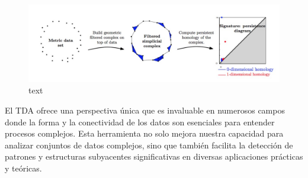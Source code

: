 \begin{figure}[H]
	\centering
	\includegraphics[width=130mm]{img/tda-workflow.jpeg}
	\caption{text}
\end{figure}

El TDA ofrece una perspectiva única que es invaluable en numerosos campos donde la forma y la conectividad de los datos son esenciales para entender procesos complejos. Esta herramienta no solo mejora nuestra capacidad para analizar conjuntos de datos complejos, sino que también facilita la detección de patrones y estructuras subyacentes significativas en diversas aplicaciones prácticas y teóricas.


\endinput
